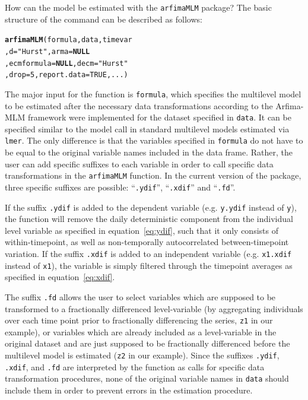 \documentclass[12pt]{paper}\usepackage[]{graphicx}\usepackage[]{color}
\makeatletter
\newcommand{\hlnum}[1]{\textcolor[rgb]{0.686,0.059,0.569}{#1}}%
\newcommand{\hlstr}[1]{\textcolor[rgb]{0.192,0.494,0.8}{#1}}%
\newcommand{\hlstd}[1]{\textcolor[rgb]{0.345,0.345,0.345}{#1}}%
\newcommand{\hlkwa}[1]{\textcolor[rgb]{0.161,0.373,0.58}{\textbf{#1}}}%
\newcommand{\hlkwc}[1]{\textcolor[rgb]{0.333,0.667,0.333}{#1}}%
\newcommand{\hlkwd}[1]{\textcolor[rgb]{0.737,0.353,0.396}{\textbf{#1}}}%
\newenvironment{kframe}{%
 \def\at@end@of@kframe{}%
 \ifinner\ifhmode%
  \def\at@end@of@kframe{\end{minipage}}%
  \begin{minipage}{\columnwidth}%
 \fi\fi%
 \def\FrameCommand##1{\hskip\@totalleftmargin \hskip-\fboxsep
 \colorbox{shadecolor}{##1}\hskip-\fboxsep
     \hskip-\linewidth \hskip-\@totalleftmargin \hskip\columnwidth}%
 \MakeFramed {\advance\hsize-\width
   \@totalleftmargin\z@ \linewidth\hsize
   \@setminipage}}%
 {\par\unskip\endMakeFramed%
 \at@end@of@kframe}
\newenvironment{knitrout}{}{} %
\makeatother
\begin{document}
How can the model be estimated with the \texttt{arfimaMLM} package? The basic structure of the command can be described as follows:

\begin{knitrout}
\color{fgcolor}\begin{kframe}
\begin{alltt}
\hlkwd{arfimaMLM}\hlstd{(formula, data, timevar}
          \hlstd{,} \hlkwc{d} \hlstd{=} \hlstr{"Hurst"}\hlstd{,} \hlkwc{arma} \hlstd{=} \hlkwa{NULL}
          \hlstd{,} \hlkwc{ecmformula} \hlstd{=} \hlkwa{NULL}\hlstd{,} \hlkwc{decm} \hlstd{=} \hlstr{"Hurst"}
          \hlstd{,} \hlkwc{drop} \hlstd{=} \hlnum{5}\hlstd{,} \hlkwc{report.data} \hlstd{=} \hlnum{TRUE}\hlstd{, ...)}
\end{alltt}
\end{kframe}
\end{knitrout}

The major input for the function is \texttt{formula}, which specifies the multilevel model to be estimated after the necessary data transformations according to the Arfima-MLM framework were implemented for the dataset specified in \texttt{data}. It can be specified similar to the model call in standard multilevel models estimated via \texttt{lmer}. The only difference is that the variables specified in \texttt{formula} do not have to be equal to the original variable names included in the data frame. Rather, the user can add specific suffixes to each variable in order to call specific data transformations in the \texttt{arfimaMLM} function. In the current version of the package, three specific suffixes are possible: ``\texttt{.ydif}'', ``\texttt{.xdif}'' and ``\texttt{.fd}''.

If the suffix \texttt{.ydif} is added to the dependent variable (e.g. \texttt{y.ydif} instead of \texttt{y}), the function will remove the daily deterministic component from the individual level variable as specified in equation~\eqref{eq:ydif}, such that it only consists of within-timepoint, as well as non-temporally autocorrelated between-timepoint variation. If the suffix \texttt{.xdif} is added to an independent variable (e.g. \texttt{x1.xdif} instead of \texttt{x1}), the variable is simply filtered through the timepoint averages as specified in equation~\eqref{eq:xdif}.

The suffix \texttt{.fd} allows the user to select variables which are supposed to be transformed to a fractionally differenced level-variable (by aggregating individuals over each time point prior to fractionally differencing the series, \texttt{z1} in our example), or variables which are already included as a level-variable in the original dataset and are just supposed to be fractionally differenced before the multilevel model is estimated (\texttt{z2} in our example). Since the suffixes \texttt{.ydif}, \texttt{.xdif}, and \texttt{.fd} are interpreted by the function as calls for specific data transformation procedures, none of the original variable names in \texttt{data} should include them in order to prevent errors in the estimation procedure.
\end{document}
